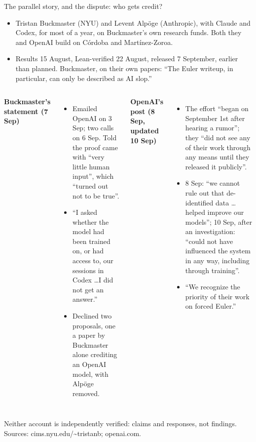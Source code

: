 \documentclass[aspectratio=169, 10pt]{beamer}
\newcommand{\src}[1]{{\par\vspace{2pt}\scriptsize\color{inkmuted}#1\par}}
\newcommand{\q}[1]{``#1''}
\begin{document}
\begin{frame}{The parallel story, and the dispute: who gets credit?}
  \footnotesize
  \begin{itemize}
    \item Tristan Buckmaster (NYU) and Levent Alpöge (Anthropic), with Claude
      and Codex, for most of a year, on Buckmaster's own research funds. Both
      they and OpenAI build on Córdoba and Martínez-Zoroa.
    \item Results 15 August, Lean-verified 22 August, released 7 September,
      earlier than planned. Buckmaster, on their own papers: \q{The Euler
      writeup, in particular, can only be described as AI slop.}
  \end{itemize}
  \begin{columns}[t]
    \textbf{Buckmaster's statement (7 Sep)}
    \begin{itemize}
      \item Emailed OpenAI on 3 Sep; two calls on 6 Sep. Told the proof came
        with \q{very little human input}, which \q{turned out not to be true}.
      \item \q{I asked whether the model had been trained on, or had access to,
        our sessions in Codex \ldots I did not get an answer.}
      \item Declined two proposals, one a paper by Buckmaster alone crediting
        an OpenAI model, with Alpöge removed.
    \end{itemize}
    \textbf{OpenAI's post (8 Sep, updated 10 Sep)}
    \begin{itemize}
      \item The effort \q{began on September 1st after hearing a rumor}; they
        \q{did not see any of their work through any means until they released
        it publicly}.
      \item 8 Sep: \q{we cannot rule out that de-identified data \ldots helped
        improve our models}; 10 Sep, after an investigation: \q{could not have
        influenced the system in any way, including through training}.
      \item \q{We recognize the priority of their work on forced Euler.}
    \end{itemize}
  \end{columns}
  \src{Neither account is independently verified: claims and responses, not findings. Sources: cims.nyu.edu/\textasciitilde tristanb; openai.com.}
\end{frame}
\end{document}
